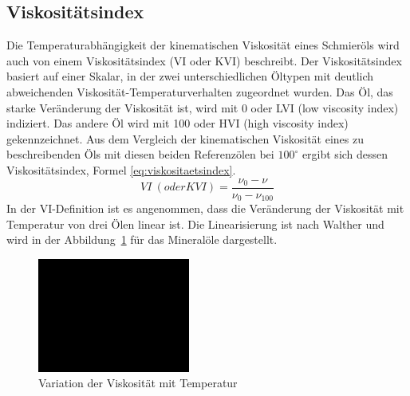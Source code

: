 \subsection*{Viskositätsindex}
\label{sub:Viskositaetsindex}
Die Temperaturabhängigkeit der kinematischen Viskosität eines Schmieröls wird auch von einem Viskositätsindex (VI oder KVI) beschreibt.
Der Viskositätsindex basiert auf einer Skalar, in der zwei unterschiedlichen Öltypen mit deutlich abweichenden Viskosität-Temperaturverhalten zugeordnet wurden.
Das Öl, das starke Veränderung der Viskosität ist, wird mit 0 oder LVI (low viscosity index) indiziert.
Das andere Öl wird mit 100 oder HVI (high viscosity index) gekennzeichnet.
Aus dem Vergleich der kinematischen Viskosität eines zu beschreibenden Öls mit diesen beiden Referenzölen bei $100^\circ$  ergibt sich dessen Viskositätsindex, Formel \ref{eq:viskositaetsindex}.
\begin{equation}
    VI~(oder KVI) = \frac{\nu_0 - \nu}{\nu_0 - \nu_{100}}
    \label{eq:viskositaetsindex}
\end{equation}
%
In der VI-Definition ist es angenommen, dass die Veränderung der Viskosität mit Temperatur von drei Ölen linear ist.
Die Linearisierung ist nach Walther\cite{walther} und wird in der Abbildung~\ref{fig:variation_der_viskositaet_mit_temperatur} für das Mineralöle dargestellt.
\begin{figure}[htb]
    \centering
    \includegraphics[width=5cm]{./images/blank_img.jpg}
    \caption{Variation der Viskosität mit Temperatur}
    \label{fig:variation_der_viskositaet_mit_temperatur}
\end{figure}


